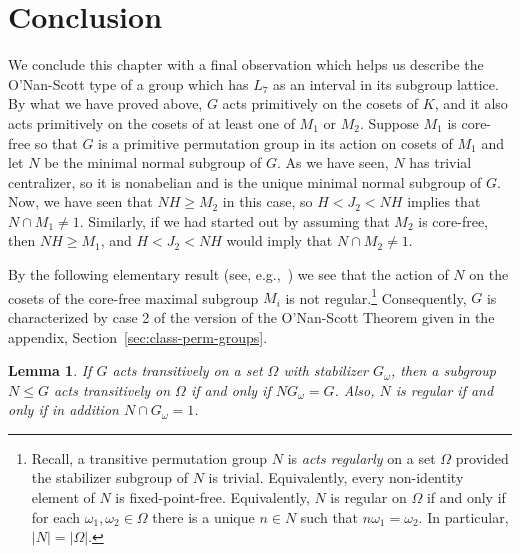 \documentclass[cm,dissertation]{uhthesis}
\theoremstyle{plain}
\newtheorem{lemma}[theorem]{Lemma}
\theoremstyle{definition}
\newcounter{conjecture}
\theoremstyle{remark}
\numberwithin{theorem}{section}
\numberwithin{claim}{chapter}
\numberwithin{equation}{section}
\numberwithin{conjecture}{chapter}
\newcommand{\<}{\ensuremath{\langle}}
\renewcommand{\>}{\ensuremath{\rangle}}
\renewcommand{\leq}{\ensuremath{\leqslant}}
\renewcommand{\geq}{\ensuremath{\geqslant}}
\newcommand{\subnormal}{\ensuremath{\trianglelefteqslant}}
\newcommand{\0}{\ensuremath{\mathbf{0}}}
\newcommand{\1}{\ensuremath{\mathbf{1}}}
\newcommand{\2}{\ensuremath{\mathbf{2}}}
\newcommand{\3}{\ensuremath{\mathbf{3}}}
\newcommand{\4}{\ensuremath{\mathbf{4}}}
\newcommand{\5}{\ensuremath{\mathbf{5}}}
\begin{document}
\section{Conclusion}
We conclude this chapter with a final observation which helps us describe the
O'Nan-Scott type of a group which has $L_7$ as an interval in its subgroup
lattice.  %
By what we have proved above, $G$ acts
primitively on the cosets of $K$, and it also acts primitively on the cosets of
at least one of $M_1$ or $M_2$.  Suppose $M_1$ is core-free so that 
$G$ is a primitive permutation group in its action on cosets of $M_1$ and let 
$N$ be the minimal normal subgroup of $G$.  As we have seen, $N$ has trivial
centralizer, so it is nonabelian and is the unique minimal normal subgroup of
$G$.
Now, we have seen that $NH \geq M_2$ in this case, so $H < J_2 < NH$ implies
that $N\cap M_1 \neq 1$.
Similarly, if we had started out by assuming that $M_2$ is core-free, then $NH
\geq M_1$, and $H < J_2 < NH$ would imply
that $N\cap M_2 \neq 1$.  

By the following elementary result (see,
e.g.,~\cite{Isaacs:2008}) we see that the action of $N$ on the cosets of the
core-free maximal subgroup $M_i$ is not regular.\footnote{Recall, 
a transitive permutation group $N$ is
\emph{acts regularly} on a set $\Omega$ provided the stabilizer subgroup of $N$
is trivial.  Equivalently, every non-identity element of $N$ is
fixed-point-free. Equivalently,
$N$ is regular on $\Omega$ if and only if for each $\omega_1, \omega_2 \in
\Omega$ there is a unique $n\in N$ such that $n\omega_1 = \omega_2$.  
In particular, $|N| = |\Omega|$.}
Consequently, $G$ is characterized by case 2 of the version of the O'Nan-Scott
Theorem given in the appendix, Section~\ref{sec:class-perm-groups}. 
\begin{lemma}
If $G$ acts transitively on a set $\Omega$ with stabilizer $G_\omega$, then 
a subgroup $N\leq G$ acts transitively on $\Omega$ if and only if 
$NG_\omega = G$. Also, $N$ is regular if and only if in addition $N \cap
G_\omega = 1$. 
\end{lemma}

\end{document}
